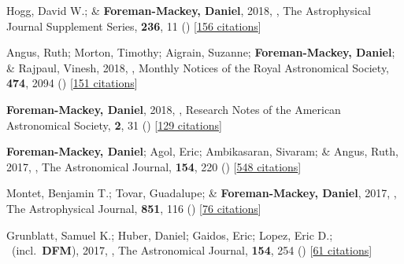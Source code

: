 \item[{\color{numcolor}\scriptsize34}] Hogg, David W.; \& \textbf{Foreman-Mackey, Daniel}, 2018, , The Astrophysical Journal Supplement Series, \textbf{236}, 11 () [\href{https://ui.adsabs.harvard.edu/abs/2018ApJS..236...11H}{156 citations}]

\item[{\color{numcolor}\scriptsize33}] Angus, Ruth; Morton, Timothy; Aigrain, Suzanne; \textbf{Foreman-Mackey, Daniel}; \& Rajpaul, Vinesh, 2018, , Monthly Notices of the Royal Astronomical Society, \textbf{474}, 2094 () [\href{https://ui.adsabs.harvard.edu/abs/2018MNRAS.474.2094A}{151 citations}]

\item[{\color{numcolor}\scriptsize32}] \textbf{Foreman-Mackey, Daniel}, 2018, , Research Notes of the American Astronomical Society, \textbf{2}, 31 () [\href{https://ui.adsabs.harvard.edu/abs/2018RNAAS...2...31F}{129 citations}]

\item[{\color{numcolor}\scriptsize31}] \textbf{Foreman-Mackey, Daniel}; Agol, Eric; Ambikasaran, Sivaram; \& Angus, Ruth, 2017, , The Astronomical Journal, \textbf{154}, 220 () [\href{https://ui.adsabs.harvard.edu/abs/2017AJ....154..220F}{548 citations}]

\item[{\color{numcolor}\scriptsize30}] Montet, Benjamin T.; Tovar, Guadalupe; \& \textbf{Foreman-Mackey, Daniel}, 2017, , The Astrophysical Journal, \textbf{851}, 116 () [\href{https://ui.adsabs.harvard.edu/abs/2017ApJ...851..116M}{76 citations}]

\item[{\color{numcolor}\scriptsize29}] Grunblatt, Samuel K.; Huber, Daniel; Gaidos, Eric; Lopez, Eric D.; \etal\ (incl.\ \textbf{DFM}), 2017, , The Astronomical Journal, \textbf{154}, 254 () [\href{https://ui.adsabs.harvard.edu/abs/2017AJ....154..254G}{61 citations}]

